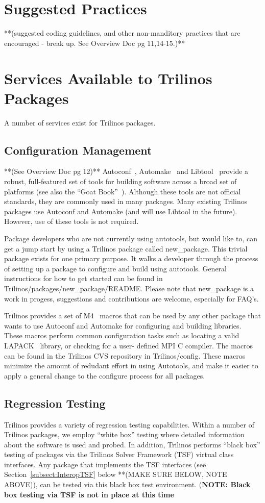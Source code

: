 \documentclass[12pt,relax]{TrilinosDevGuide}
\begin{document}
	\chapter{Suggested Practices}
	**(suggested coding guidelines, and other non-manditory practices that are encouraged - break up.  See Overview Doc pg 11,14-15.)**
	


	\chapter{Services Available to Trilinos Packages}
	A number of services exist for Trilinos packages.
	\section{Configuration Management}
	**(See Overview Doc pg 12)**
Autoconf~\cite{Autoconf},  Automake~\cite{Automake} and
Libtool~\cite{Libtool} provide a robust, full-featured set of tools for
building software across a broad set of platforms (see also the ``Goat
Book''~\cite{GoatBook}).  Although these
tools are not official standards, they are commonly used in many
packages.  Many existing
Trilinos packages use Autoconf and Automake (and will use
Libtool in the future).  However, use of these tools is not required.

Package developers who are not currently using autotools, but would like
to, can get a jump start by using a Trilinos package called 
new_package.  This trivial package exists for one primary 
purpose.  It walks a developer through the process of setting up a 
package to configure and build using autotools.  General instructions for
how to get started can be found in Trilinos/packages/new_package/README.  
Please note that new_package is a work in progess, suggestions and 
contributions are welcome, especially for FAQ's.

Trilinos provides a set of M4~\cite{M4} macros that can be used by any other
package that wants to use Autoconf and Automake for configuring and
building libraries.  These macros perform common configuration tasks such as
locating a valid LAPACK~\cite{lapack} library, or checking for a user-
defined MPI C compiler.  The macros can be found in the Trilinos CVS 
repository in Trilinos/config.  These macros minimize the amount of redudant
 effort in using Autotools, and make it easier to apply a general change to 
the configure process for all packages.
	\section{Regression Testing}
Trilinos provides a variety of regression
testing capabilities.  Within a number of Trilinos packages, we employ
``white box'' testing where detailed information about the software is
used and probed.  In addition, Trilinos performs ``black box'' testing
of packages via the Trilinos Solver Framework (TSF) virtual class
interfaces.  Any package that implements the TSF interfaces (see
Section~\ref{subsect:InteropTSF} below **(MAKE SURE BELOW, NOTE ABOVE)), can be tested via this black box
test environment.  ({\bf NOTE: Black box testing via TSF is not in
place at this time}
\end{document}
